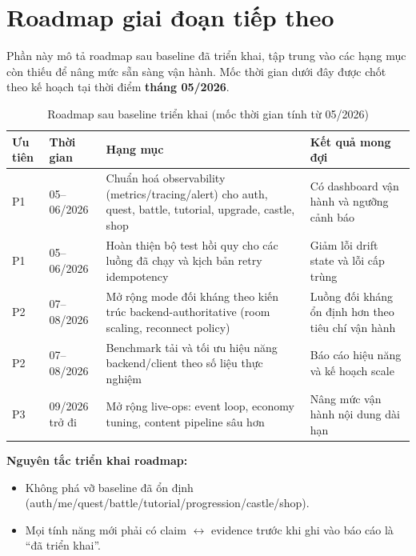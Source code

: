 \section*{Roadmap giai đoạn tiếp theo}

Phần này mô tả roadmap sau baseline đã triển khai, tập trung vào các hạng mục còn thiếu để nâng mức sẵn sàng vận hành.
Mốc thời gian dưới đây được chốt theo kế hoạch tại thời điểm \textbf{tháng 05/2026}.

\renewcommand{\arraystretch}{1.2}
\begin{table}[H]
\centering
\setlength{\tabcolsep}{6pt}
\begin{tabularx}{\textwidth}{|p{1.6cm}|p{2.8cm}|X|p{3.6cm}|}
\hline
\textbf{Ưu tiên} & \textbf{Thời gian} & \textbf{Hạng mục} & \textbf{Kết quả mong đợi} \\
\hline
P1 & 05--06/2026 & Chuẩn hoá observability (metrics/\allowbreak tracing/\allowbreak alert) cho auth, quest, battle, tutorial, upgrade, castle, shop & Có dashboard vận hành và ngưỡng cảnh báo \\
\hline
P1 & 05--06/2026 & Hoàn thiện bộ test hồi quy cho các luồng đã chạy và kịch bản retry idempotency & Giảm lỗi drift state và lỗi cấp trùng \\
\hline
P2 & 07--08/2026 & Mở rộng mode đối kháng theo kiến trúc backend-authoritative (room scaling, reconnect policy) & Luồng đối kháng ổn định hơn theo tiêu chí vận hành \\
\hline
P2 & 07--08/2026 & Benchmark tải và tối ưu hiệu năng backend/\allowbreak client theo số liệu thực nghiệm & Báo cáo hiệu năng và kế hoạch scale \\
\hline
P3 & 09/2026 trở đi & Mở rộng live-ops: event loop, economy tuning, content pipeline sâu hơn & Nâng mức vận hành nội dung dài hạn \\
\hline
\end{tabularx}
\caption{Roadmap sau baseline triển khai (mốc thời gian tính từ 05/2026)}
\label{tab:next-phase-roadmap}
\end{table}

\noindent
\textbf{Nguyên tắc triển khai roadmap:}
\begin{itemize}
    \item Không phá vỡ baseline đã ổn định (auth/\allowbreak me/\allowbreak quest/\allowbreak battle/\allowbreak tutorial/\allowbreak progression/\allowbreak castle/\allowbreak shop).
    \item Mọi tính năng mới phải có claim $\leftrightarrow$ evidence trước khi ghi vào báo cáo là ``đã triển khai''.
\end{itemize}
